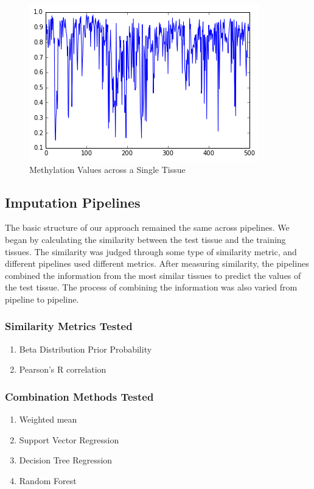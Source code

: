 \documentclass{article} %
\begin{document}
\begin{figure}[!ht]
\begin{center}
\caption{Methylation Values across a Single Tissue}
\begin{minipage}[b]{0.40\linewidth}
	\includegraphics[scale=0.4]{GraphMethylationValues.png}
\end{minipage}
\end{center}
\end{figure}

\subsection{Imputation Pipelines}
The basic structure of our approach remained the same across pipelines. We began by calculating the similarity between the test tissue and the training tissues. The similarity was judged through some type of similarity metric, and different pipelines used different metrics. After measuring similarity, the pipelines combined the information from the most similar tissues to predict the values of the test tissue. The process of combining the information was also varied from pipeline to pipeline.
\subsubsection{Similarity Metrics Tested}
\begin{enumerate}
	\item Beta Distribution Prior Probability
	\item Pearson's R correlation
\end{enumerate}

\subsubsection{Combination Methods Tested}
\begin{enumerate}
	\item Weighted mean
	\item Support Vector Regression
	\item Decision Tree Regression
	\item Random Forest
\end{enumerate}
\end{document}
